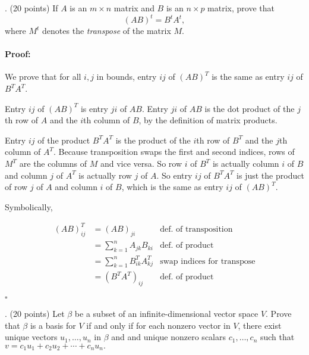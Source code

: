 \documentclass[12pt]{article}
\newenvironment{proof}{\paragraph{Proof:}}{\hfill$\square$}
\begin{document}
    
    \newpage
    
    . (20 points) If $A$ is an $m \times n$ matrix and $B$ is an $n \times p$ matrix, prove that
    \[(AB)^t = B^t A^t,\]
    where $M^t$ denotes the \textit{transpose} of the matrix $M$.
    \begin{proof}
    
    We prove that for all $i,j$ in bounds, entry $ij$ of $(AB)^T$ is the same as entry $ij$ of $B^TA^T$.
    
    Entry $ij$ of $(AB)^T$ is entry $ji$ of $AB$. Entry $ji$ of $AB$ is the dot product of the $j$th row of $A$ and the $i$th column of $B$, by the definition of matrix products.
    
    Entry $ij$ of the product $B^TA^T$ is the product of the $i$th row of $B^T$ and the $j$th column of $A^T$. Because transposition swaps the first and second indices, rows of $M^T$ are the columns of $M$ and vice versa. So row $i$ of $B^T$ is actually column $i$ of $B$ and column $j$ of $A^T$ is actually row $j$ of $A$. So entry $ij$ of $B^TA^T$ is just the product of row $j$ of $A$ and column $i$ of $B$, which is the same as entry $ij$ of $(AB)^T$.
    
    Symbolically,
    
    \begin{align*}
    (AB)^T_{ij} &= (AB)_{ji} & \text{def. of transposition}\\
    &= \sum_{k=1}^n A_{jk}B_{ki} &\text{def. of product}\\
    &= \sum_{k=1}^n B^T_{ik}A^T_{kj} &\text{swap indices for transpose}\\
    &= (B^TA^T)_{ij} &\text{def. of product}
    \end{align*}
    
    \end{proof}
    \newpage
    
    . (20 points) Let $\beta$ be a subset of an infinite-dimensional vector space $V$.  Prove that $\beta$ is a basis for $V$ if and only if for each nonzero vector in $V$, there exist unique vectors $u_1, \dots, u_n$ in $\beta$ and and unique nonzero scalars $c_1, \dots, c_n$ such that $v = c_1u_1 + c_2u_2 + \cdots + c_nu_n.$\\
    
\end{document}
